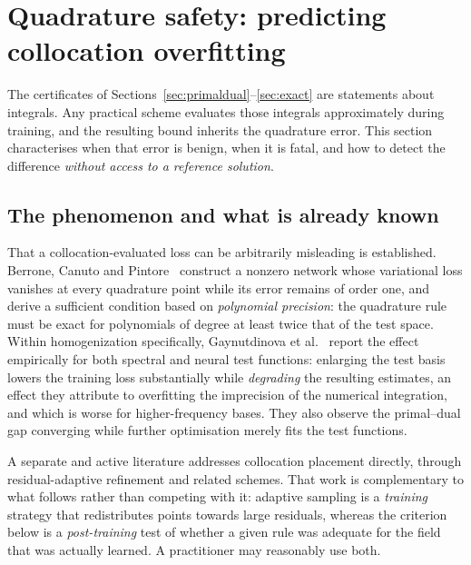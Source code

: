
\section{Quadrature safety: predicting collocation overfitting}
\label{sec:quadrature}

The certificates of Sections~\ref{sec:primaldual}--\ref{sec:exact} are
statements about integrals. Any practical scheme evaluates those integrals
approximately during training, and the resulting bound inherits the
quadrature error. This section characterises when that error is benign,
when it is fatal, and how to detect the difference \emph{without access to
a reference solution}.

\subsection{The phenomenon and what is already known}
\label{sec:quad:prior}

That a collocation-evaluated loss can be arbitrarily misleading is
established. Berrone, Canuto and Pintore~\cite{Berrone2022} construct a
nonzero network whose variational loss vanishes at every quadrature point
while its error remains of order one, and derive a sufficient condition
based on \emph{polynomial precision}: the quadrature rule must be exact for
polynomials of degree at least twice that of the test space. Within
homogenization specifically, Gaynutdinova et al.~\cite{Gaynutdinova2026}
report the effect empirically for both spectral and neural test functions:
enlarging the test basis lowers the training loss substantially while
\emph{degrading} the resulting estimates, an effect they attribute to
overfitting the imprecision of the numerical integration, and which is
worse for higher-frequency bases. They also observe the primal--dual gap
converging while further optimisation merely fits the test functions.

A separate and active literature addresses collocation placement directly,
through residual-adaptive refinement and related schemes. That work is
complementary to what follows rather than competing with it: adaptive
sampling is a \emph{training} strategy that redistributes points towards
large residuals, whereas the criterion below is a \emph{post-training} test
of whether a given rule was adequate for the field that was actually
learned. A practitioner may reasonably use both.

